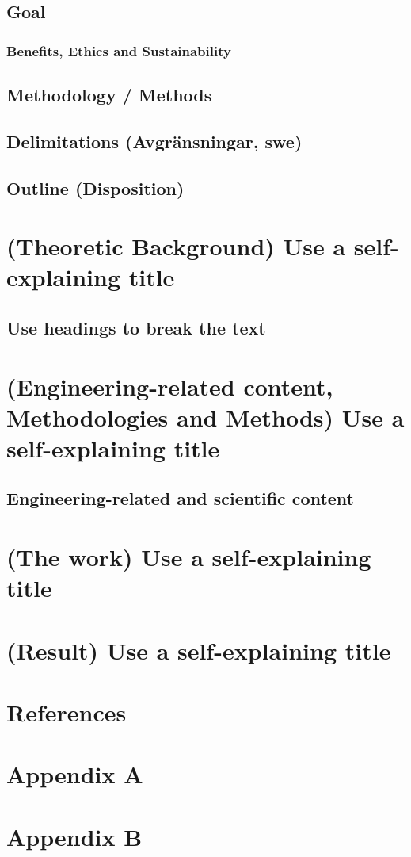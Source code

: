 \documentclass{article}
\begin{document}
\subsection{Goal}
\subsubsection{Benefits, Ethics and Sustainability}
\subsection{Methodology / Methods}
\subsection{Delimitations (Avgränsningar, swe)}
\subsection{Outline (Disposition)}

\newpage

\section{(Theoretic Background) Use a self-explaining title}
\subsection{Use headings to break the text}

\newpage

\section{(Engineering-related content, Methodologies and Methods) Use a self-explaining title}
\subsection{Engineering-related and scientific content}

\newpage

\section{ (The work) Use a self-explaining title}

\newpage

\section{ (Result) Use a self-explaining title}

\newpage


\section{References}
\newpage

\section{Appendix A}
\newpage

\section{Appendix B}
\newpage
\end{document}

